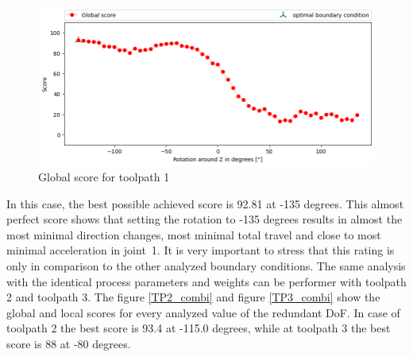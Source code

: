 \begin{figure}[H]
	\centerline{\includegraphics[width=1\textwidth]{figures/best_c_1.png}}
	\caption{Global score for toolpath 1}
	\label{GS1}
\end{figure}
In this case, the best possible achieved score is 92.81 at -135 degrees. This almost perfect score shows that setting the rotation to -135 degrees results in almost the most minimal direction changes,  most minimal total travel and close to most minimal acceleration in joint~1. It is very important to stress that this rating is only in comparison to the other analyzed boundary conditions.
\newpage
The same analysis with the identical process parameters and weights can be performer with toolpath 2 and toolpath 3. The figure \ref{TP2_combi} and figure \ref{TP3_combi} show the global and local scores for every analyzed value of the redundant DoF. In case of toolpath 2 the best score is 93.4 at -115.0 degrees, while at toolpath 3 the best score is 88 at -80 degrees.



